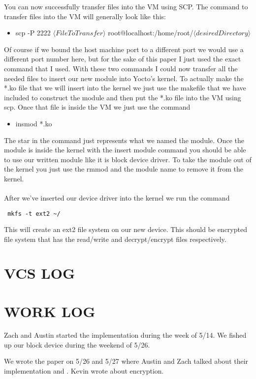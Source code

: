 \documentclass[onecolumn, draftclsnofoot,10pt, compsoc]{IEEEtran}
\begin{document}
    You can now successfully transfer files into the VM using SCP. The command to transfer files into the VM will generally look like this:
    
    \begin{itemize}
        \item scp -P 2222 $\langle File To Transfer \rangle$ root@localhost:/home/root/$\langle desired Directory \rangle$
    \end{itemize}
    
    Of course if we bound the host machine port to a different port we would use a different port number here, but for the sake of this paper I just used the exact command that I used. With these two commands I could now transfer all the needed files to insert our new module into Yocto's kernel. To actually make the *.ko file that we will insert into the kernel we just use the makefile that we have included to construct the module and then put the *.ko file into the VM using scp. Once that file is inside the VM we just use the command 
    
    \begin{itemize}
        \item insmod *.ko
    \end{itemize}
    
    
    The star in the command just represents what we named the module. Once the module is inside the kernel with the insert module command you should be able to use our written module like it is block device driver. To take the module out of the kernel you just use the rmmod and the module name to remove it from the kernel.\\
   \\ After we've inserted our device driver into the kernel we run the command \begin{verbatim} mkfs -t ext2 ~/ \end{verbatim} This will create an ext2 file system on our new device. This should be encrypted file system that has the read/write and decrypt/encrypt files respectively.
    \section{VCS LOG}
    
    \section{WORK LOG}
    Zach and Austin started the implementation during the week of 5/14. We fished up our block device during the weekend of 5/26.
    
    We wrote the paper on 5/26 and 5/27 where Austin and Zach talked about their implementation and . Kevin wrote about encryption.
    
        
\end{document}
